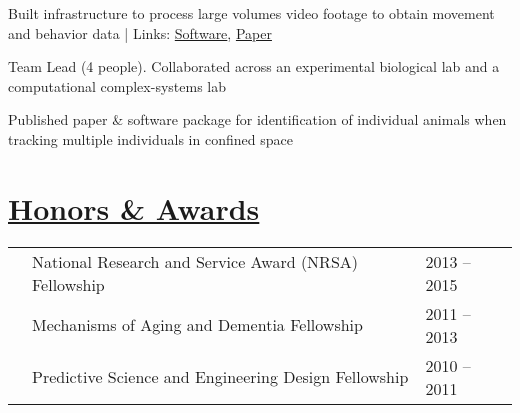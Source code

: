 \documentclass[]{winter-resume-openfont}
\begin{document}
\begin{minipage}[t]{0.65\textwidth}
\begin{tightemize}
\item Built infrastructure to process large volumes video footage 
to obtain movement and behavior data | Links: \href{https://amaral.northwestern.edu/resources/software/waldo}{Software},  \href{http://www.nature.com/articles/srep34859}{Paper} 
\item Team Lead (4 people).  Collaborated across an experimental biological lab and a computational complex-systems lab
\item  Published paper \& software package for identification of individual animals when tracking multiple individuals in confined space
\end{tightemize}

\sectionsep


\sectionsep





\section{\underline{Honors \& Awards}}
\begin{tabular}{lll}
\textbullet{}   & National Research and Service Award (NRSA) Fellowship & 2013 – 2015	\\
\textbullet{}   & Mechanisms of Aging and Dementia Fellowship & 2011 – 2013\\
\textbullet{}  &Predictive Science and Engineering Design Fellowship & 2010 – 2011\\
\end{tabular}
\sectionsep





\end{minipage}
\end{document}
